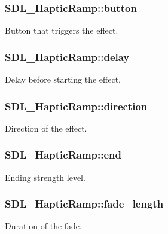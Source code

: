 \subsubsection[{button}]{ S\+D\+L\+\_\+\+Haptic\+Ramp\+::button}\label{structSDL__HapticRamp_a2027c6fd88f1ebe652c90c71410ee0bf}
Button that triggers the effect. \hypertarget{structSDL__HapticRamp_ac9471016f41919b4a1c786bbd649a777}{}
\subsubsection[{delay}]{ S\+D\+L\+\_\+\+Haptic\+Ramp\+::delay}\label{structSDL__HapticRamp_ac9471016f41919b4a1c786bbd649a777}
Delay before starting the effect. \hypertarget{structSDL__HapticRamp_a6fb6c67ccf262b8f3ec08bcdf08f9965}{}
\subsubsection[{direction}]{ S\+D\+L\+\_\+\+Haptic\+Ramp\+::direction}\label{structSDL__HapticRamp_a6fb6c67ccf262b8f3ec08bcdf08f9965}
Direction of the effect. \hypertarget{structSDL__HapticRamp_a16dd3ee307795248e21ee45ba8fb4c6c}{}
\subsubsection[{end}]{ S\+D\+L\+\_\+\+Haptic\+Ramp\+::end}\label{structSDL__HapticRamp_a16dd3ee307795248e21ee45ba8fb4c6c}
Ending strength level. \hypertarget{structSDL__HapticRamp_ad58a8f7cfdf659b45f0503fc56db7436}{}
\subsubsection[{fade\+\_\+length}]{ S\+D\+L\+\_\+\+Haptic\+Ramp\+::fade\+\_\+length}\label{structSDL__HapticRamp_ad58a8f7cfdf659b45f0503fc56db7436}
Duration of the fade. \hypertarget{structSDL__HapticRamp_a66b586f2e6a23a085a7b2854f61752c5}{}
